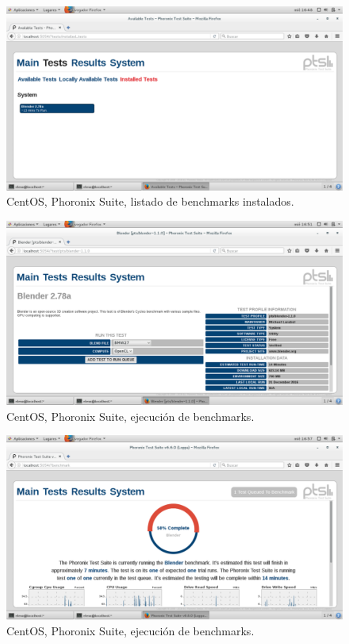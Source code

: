 \begin{figure}[H] 
	\centering
	\includegraphics[width=14.7cm]{./img/ejercicio1_7.png} 	
	\caption{CentOS, Phoronix Suite, listado de benchmarks instalados.} \label{fig:ejercicio1_7}
\end{figure}

\begin{figure}[H] 
	\centering
	\includegraphics[width=14.7cm]{./img/ejercicio1_8.png} 	
	\caption{CentOS, Phoronix Suite, ejecución de benchmarks.} \label{fig:ejercicio1_8}
\end{figure}

\begin{figure}[H] 
	\centering
	\includegraphics[width=14.7cm]{./img/ejercicio1_9.png} 	
	\caption{CentOS, Phoronix Suite, ejecución de benchmarks.} \label{fig:ejercicio1_9}
\end{figure}

